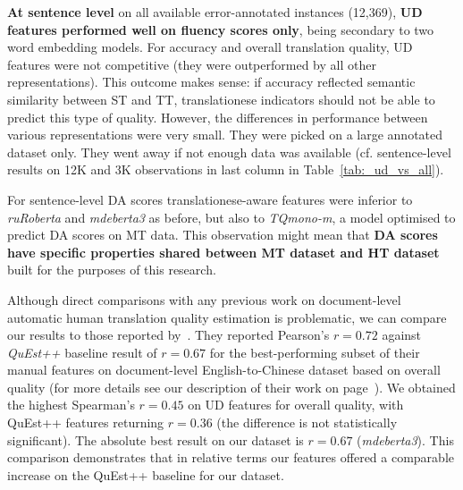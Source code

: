 \textbf{At sentence level} on all available error-annotated instances (12,369), \textbf{UD features performed well on fluency scores only}, being secondary to two word embedding models. For accuracy and overall translation quality, UD features were not competitive (they were outperformed by all other representations). This outcome makes sense: if accuracy reflected semantic similarity between ST and TT, translationese indicators should not be able to predict this type of quality. However, the differences in performance between various representations were very small. They were picked on a large annotated dataset only. They went away if not enough data was available (cf. sentence-level results on 12K and 3K observations in last column in Table~\ref{tab:_ud_vs_all}).

For sentence-level DA scores translationese-aware features were inferior to \textit{ruRoberta} and \textit{mdeberta3} as before, but also to \textit{TQmono-m}, a model optimised to predict DA scores on MT data. This observation might mean that \textbf{DA scores have specific properties shared between MT dataset and HT dataset} built for the purposes of this research. 

Although direct comparisons with any previous work on document-level automatic human translation quality estimation is problematic, we can compare our results to those reported by~\citet{Yuan2018}. %
They reported Pearson's $r=0.72$ against \textit{QuEst++} baseline result of $r=0.67$ for the best-performing subset of their manual features on document-level English-to-Chinese dataset based on overall quality (for more details see our description of their work on page~\pageref{pg:yuan_previous}). %
We obtained the highest Spearman's $r=0.45$ on UD features for overall quality, with QuEst++ features returning $r=0.36$ (the difference is not statistically significant). The absolute best result on our dataset is $r=0.67$ (\textit{mdeberta3}). This comparison demonstrates that in relative terms our features offered a comparable increase on the QuEst++ baseline for our dataset. %


